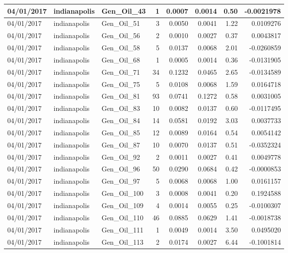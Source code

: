 \documentclass[
  letterpaper,
  DIV=11,
  numbers=noendperiod]{scrartcl}
\begin{document}
\begin{tabular}{l|l|l|r|r|r|r|r}
\hline
04/01/2017 & indianapolis & Gen\_Oil\_43 & 1 & 0.0007 & 0.0014 & 0.50 & -0.0021978\\
\hline
04/01/2017 & indianapolis & Gen\_Oil\_51 & 3 & 0.0050 & 0.0041 & 1.22 & 0.0109276\\
\hline
04/01/2017 & indianapolis & Gen\_Oil\_56 & 2 & 0.0010 & 0.0027 & 0.37 & 0.0043817\\
\hline
04/01/2017 & indianapolis & Gen\_Oil\_58 & 5 & 0.0137 & 0.0068 & 2.01 & -0.0260859\\
\hline
04/01/2017 & indianapolis & Gen\_Oil\_68 & 1 & 0.0005 & 0.0014 & 0.36 & -0.0131905\\
\hline
04/01/2017 & indianapolis & Gen\_Oil\_71 & 34 & 0.1232 & 0.0465 & 2.65 & -0.0134589\\
\hline
04/01/2017 & indianapolis & Gen\_Oil\_75 & 5 & 0.0108 & 0.0068 & 1.59 & 0.0164718\\
\hline
04/01/2017 & indianapolis & Gen\_Oil\_81 & 93 & 0.0741 & 0.1272 & 0.58 & 0.0031005\\
\hline
04/01/2017 & indianapolis & Gen\_Oil\_83 & 10 & 0.0082 & 0.0137 & 0.60 & -0.0117495\\
\hline
04/01/2017 & indianapolis & Gen\_Oil\_84 & 14 & 0.0581 & 0.0192 & 3.03 & 0.0037733\\
\hline
04/01/2017 & indianapolis & Gen\_Oil\_85 & 12 & 0.0089 & 0.0164 & 0.54 & 0.0054142\\
\hline
04/01/2017 & indianapolis & Gen\_Oil\_87 & 10 & 0.0070 & 0.0137 & 0.51 & -0.0352324\\
\hline
04/01/2017 & indianapolis & Gen\_Oil\_92 & 2 & 0.0011 & 0.0027 & 0.41 & 0.0049778\\
\hline
04/01/2017 & indianapolis & Gen\_Oil\_96 & 50 & 0.0290 & 0.0684 & 0.42 & -0.0000853\\
\hline
04/01/2017 & indianapolis & Gen\_Oil\_97 & 5 & 0.0068 & 0.0068 & 1.00 & 0.0161157\\
\hline
04/01/2017 & indianapolis & Gen\_Oil\_100 & 3 & 0.0008 & 0.0041 & 0.20 & 0.1924588\\
\hline
04/01/2017 & indianapolis & Gen\_Oil\_109 & 4 & 0.0014 & 0.0055 & 0.25 & -0.0100307\\
\hline
04/01/2017 & indianapolis & Gen\_Oil\_110 & 46 & 0.0885 & 0.0629 & 1.41 & -0.0018738\\
\hline
04/01/2017 & indianapolis & Gen\_Oil\_111 & 1 & 0.0049 & 0.0014 & 3.50 & 0.0495020\\
\hline
04/01/2017 & indianapolis & Gen\_Oil\_113 & 2 & 0.0174 & 0.0027 & 6.44 & -0.1001814\\

\end{tabular}
\end{document}
